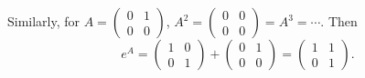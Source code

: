 \begin{example}
Similarly, for $A = \begin{pmatrix} 0 & 1 \\ 0 & 0 \end{pmatrix}$, $A^2 = \begin{pmatrix} 0 & 0 \\ 0 & 0 \end{pmatrix} = A^3 = \cdots$. Then \[e^A = \begin{pmatrix} 1 & 0 \\ 0 & 1 \end{pmatrix} + \begin{pmatrix} 0 & 1 \\ 0 & 0 \end{pmatrix} = \begin{pmatrix} 1 & 1 \\ 0 & 1 \end{pmatrix}.\]
\end{example}

